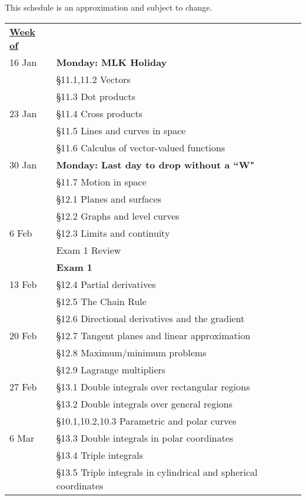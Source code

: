 \documentclass[%
]{article}
\title{}
\date{}
\begin{document}
\maketitle

\Large 
\vspace{-1in}
This schedule is an approximation and subject to change.

\begin{center}
\begin{supertabular}{p{0.15\textwidth}p{0.75\textwidth}}
{\bf\underline{Week of}} & \\ 
16 Jan & {\bf Monday: MLK Holiday} \\
 & \S 11.1,11.2 Vectors \\
 & \S 11.3 Dot products \\
23 Jan & \S 11.4 Cross products \\
 & \S 11.5 Lines and curves in space \\
 & \S 11.6 Calculus of vector-valued functions \\
30 Jan & {\bf Monday: Last day to drop without a ``W"} \\
 & \S 11.7 Motion in space \\
 & \S 12.1 Planes and surfaces \\
 & \S 12.2 Graphs and level curves \\
6 Feb & \S 12.3 Limits and continuity \\
 & Exam 1 Review \\
 & {\bf Exam 1} \\
13 Feb & \S 12.4 Partial derivatives \\
 & \S 12.5 The Chain Rule \\
 & \S 12.6 Directional derivatives and the gradient \\
20 Feb & \S 12.7 Tangent planes and linear approximation \\
 & \S 12.8 Maximum/minimum problems \\
 & \S 12.9 Lagrange multipliers \\
27 Feb & \S 13.1 Double integrals over rectangular regions \\
 & \S 13.2 Double integrals over general regions \\
 & \S 10.1,10.2,10.3 Parametric and polar curves \\
6 Mar & \S 13.3 Double integrals in polar coordinates \\
 & \S 13.4 Triple integrals \\
 & \S 13.5 Triple integrals in cylindrical and spherical coordinates \\

\end{supertabular}
\end{center}
\end{document}
